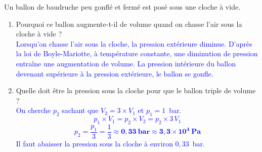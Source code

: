 \documentclass[11pt,a4paper]{article}
\newcommand{\correction}[1]{\textcolor{blue}{#1}}
\begin{document}
\begin{fleche}
\vfill 


Un ballon de baudruche peu gonflé et fermé est posé sous une cloche à vide. 

\begin{enumerate}
    \item Pourquoi ce ballon augmente-t-il de volume quand on chasse l'air sous la cloche à vide ? \\[2mm]
    \correction{Lorsqu'on chasse l'air sous la cloche, la pression extérieure diminue. D'après la loi de Boyle-Mariotte, à température constante, une diminution de pression entraîne une augmentation de volume. La pression intérieure du ballon devenant supérieure à la pression extérieure, le ballon se gonfle.}\\[2mm]

    \item Quelle doit être la pression sous la cloche pour que le ballon triple de volume ? \\[2mm]
    \correction{
    On cherche $p_2$ sachant que $V_2 = 3 \times V_1$ et $p_1 = 1$~bar.
    $$p_1 \times V_1 = p_2 \times V_2 = p_2 \times 3\,V_1$$
    $$p_2 = \frac{p_1}{3} = \frac{1}{3} \approx \mathbf{0{,}33~\text{bar} \approx 3{,}3 \times 10^4~\text{Pa}}$$
    Il faut abaisser la pression sous la cloche à environ $0{,}33$~bar.
    }
\end{enumerate}

\vfill 
\end{fleche}
\end{document}
